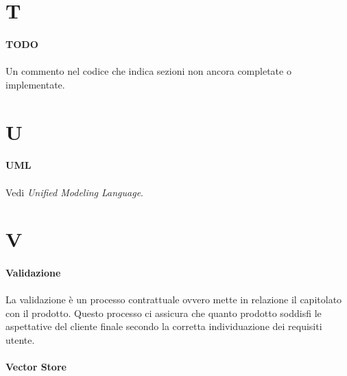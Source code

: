 \documentclass[10pt, a4paper]{article}
\begin{document}
\newpage
\section{T}
\vspace{2em}
\paragraph{TODO}\noindent\hrulefill
\paragraph{}Un commento nel codice che indica sezioni non ancora completate o implementate.


\newpage
\section{U}

\vspace{2em}
\paragraph{UML}\noindent\hrulefill 
\paragraph{}Vedi \textit{Unified Modeling Language\pg}.







\newpage
\section{V}
\vspace{2em}
\paragraph{Validazione}\noindent\hrulefill
\paragraph{}La validazione è un processo contrattuale ovvero mette in relazione il capitolato con il prodotto. Questo processo ci assicura che quanto prodotto soddisfi le aspettative del cliente finale secondo la corretta individuazione dei requisiti utente.

\vspace{2em}
\paragraph{Vector Store}\noindent\hrulefill
\end{document}
